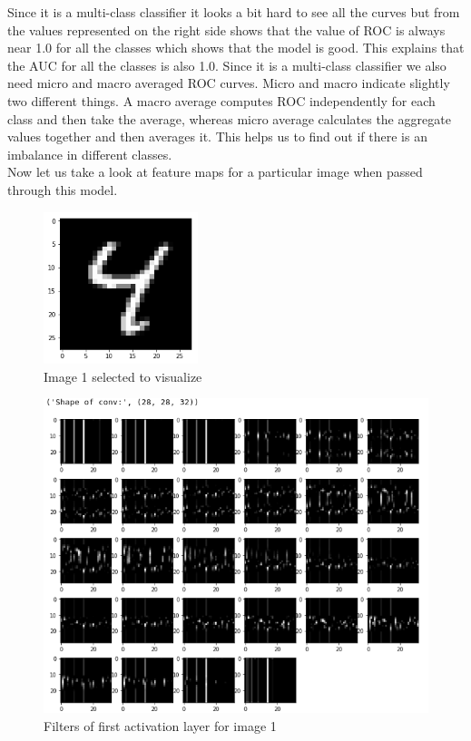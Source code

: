 \newpage \noindent Since it is a multi-class classifier it looks a bit hard to see all the curves but from the values represented on the right side shows that the value of ROC is always near 1.0 for all the classes which shows that the model is good. This explains that the AUC for all the classes is also 1.0. Since it is a multi-class classifier we also need micro and macro averaged ROC curves.  Micro and macro indicate slightly two different things. A macro average computes ROC independently for each class and then take the average, whereas micro average calculates the aggregate values together and then averages it. This helps us to find out if there is an imbalance in different classes. \\

\noindent Now let us take a look at feature maps for a particular image when passed through this model.



\begin{figure}[h]
    \centering
    \includegraphics[width=0.4\textwidth]{thesis_template/images/4.png}
    \caption{\small Image 1 selected to visualize}
    \label{}
    \end{figure}


\begin{figure}[h!]
    \centering
    \includegraphics[width=1.0\textwidth]{thesis_template/images/filters.png}
    \caption{\small Filters of first activation layer for image 1}
    \label{}
    \end{figure}


